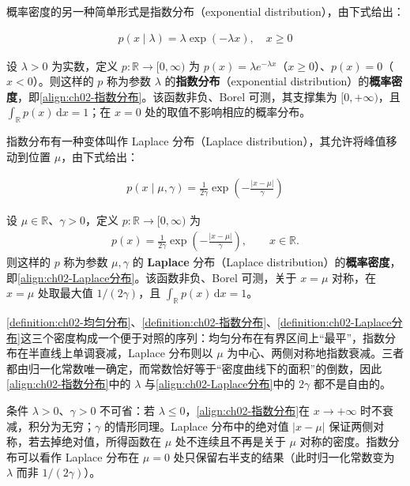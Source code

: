 \documentclass[../../main.tex]{subfiles}
\begin{document}
概率密度的另一种简单形式是指数分布（exponential distribution），由下式给出：

\begin{align}
  p(x\mid\lambda) = \lambda\exp(-\lambda x), \quad x\geqslant 0
  \label{align:ch02-指数分布}
\end{align}

\begin{definition}[指数分布]\label{definition:ch02-指数分布}
设 $\lambda>0$ 为实数，定义 $p:\mathbb{R}\to[0,\infty)$ 为 $p(x)=\lambda e^{-\lambda x}$（$x\geqslant0$）、$p(x)=0$（$x<0$）。则这样的 $p$ 称为参数 $\lambda$ 的\textbf{指数分布}（exponential distribution）的\textbf{概率密度}，即\eqref{align:ch02-指数分布}。该函数非负、Borel 可测，其支撑集为 $[0,+\infty)$，且 $\int_{\mathbb{R}}p(x)\,\mathrm{d}x=1$；在 $x=0$ 处的取值不影响相应的概率分布。
\end{definition}

指数分布有一种变体叫作 Laplace 分布（Laplace distribution），其允许将峰值移动到位置 $\mu$，由下式给出：

\begin{align}
  p(x\mid\mu,\gamma) = \frac{1}{2\gamma}\exp\left(-\frac{|x-\mu|}{\gamma}\right)
  \label{align:ch02-Laplace分布}
\end{align}

\begin{definition}[Laplace 分布]\label{definition:ch02-Laplace分布}
设 $\mu\in\mathbb{R}$、$\gamma>0$，定义 $p:\mathbb{R}\to[0,\infty)$ 为
\begin{align*}
  p(x)=\frac{1}{2\gamma}\exp\left(-\frac{|x-\mu|}{\gamma}\right),\qquad x\in\mathbb{R}.
\end{align*}
则这样的 $p$ 称为参数 $\mu,\gamma$ 的 \textbf{Laplace} 分布（Laplace distribution）的\textbf{概率密度}，即\eqref{align:ch02-Laplace分布}。该函数非负、Borel 可测，关于 $x=\mu$ 对称，在 $x=\mu$ 处取最大值 $1/(2\gamma)$，且 $\int_{\mathbb{R}}p(x)\,\mathrm{d}x=1$。
\end{definition}

\begin{remark}
\cref{definition:ch02-均匀分布}、\cref{definition:ch02-指数分布}、\cref{definition:ch02-Laplace分布}这三个密度构成一个便于对照的序列：均匀分布在有界区间上“最平”，指数分布在半直线上单调衰减，Laplace 分布则以 $\mu$ 为中心、两侧对称地指数衰减。三者都由归一化常数唯一确定，而常数恰好等于“密度曲线下的面积”的倒数，因此\eqref{align:ch02-指数分布}中的 $\lambda$ 与\eqref{align:ch02-Laplace分布}中的 $2\gamma$ 都不是自由的。

条件 $\lambda>0$、$\gamma>0$ 不可省：若 $\lambda\leqslant0$，\eqref{align:ch02-指数分布}在 $x\to+\infty$ 时不衰减，积分为无穷；$\gamma$ 的情形同理。Laplace 分布中的绝对值 $|x-\mu|$ 保证两侧对称，若去掉绝对值，所得函数在 $\mu$ 处不连续且不再是关于 $\mu$ 对称的密度。指数分布可以看作 Laplace 分布在 $\mu=0$ 处只保留右半支的结果（此时归一化常数变为 $\lambda$ 而非 $1/(2\gamma)$）。
\end{remark}
\end{document}
